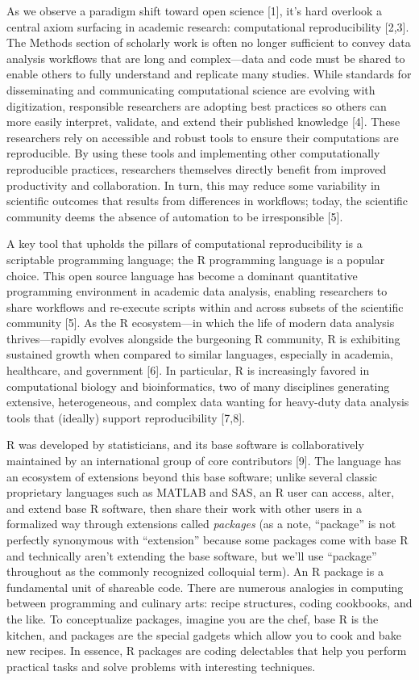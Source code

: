 \documentclass[10pt,letterpaper]{article}
\begin{document}
As we observe a paradigm shift toward open science {[}1{]}, it's hard
overlook a central axiom surfacing in academic research: computational
reproducibility {[}2,3{]}. The Methods section of scholarly work is
often no longer sufficient to convey data analysis workflows that are
long and complex---data and code must be shared to enable others to
fully understand and replicate many studies. While standards for
disseminating and communicating computational science are evolving with
digitization, responsible researchers are adopting best practices so
others can more easily interpret, validate, and extend their published
knowledge {[}4{]}. These researchers rely on accessible and robust tools
to ensure their computations are reproducible. By using these tools and
implementing other computationally reproducible practices, researchers
themselves directly benefit from improved productivity and
collaboration. In turn, this may reduce some variability in scientific
outcomes that results from differences in workflows; today, the
scientific community deems the absence of automation to be irresponsible
{[}5{]}.

A key tool that upholds the pillars of computational reproducibility is
a scriptable programming language; the R programming language is a
popular choice. This open source language has become a dominant
quantitative programming environment in academic data analysis, enabling
researchers to share workflows and re-execute scripts within and across
subsets of the scientific community {[}5{]}. As the R ecosystem---in
which the life of modern data analysis thrives---rapidly evolves
alongside the burgeoning R community, R is exhibiting sustained growth
when compared to similar languages, especially in academia, healthcare,
and government {[}6{]}. In particular, R is increasingly favored in
computational biology and bioinformatics, two of many disciplines
generating extensive, heterogeneous, and complex data wanting for
heavy-duty data analysis tools that (ideally) support reproducibility
{[}7,8{]}.

R was developed by statisticians, and its base software is
collaboratively maintained by an international group of core
contributors {[}9{]}. The language has an ecosystem of extensions beyond
this base software; unlike several classic proprietary languages such as
MATLAB and SAS, an R user can access, alter, and extend base R software,
then share their work with other users in a formalized way through
extensions called \emph{packages} (as a note, ``package'' is not
perfectly synonymous with ``extension'' because some packages come with
base R and technically aren't extending the base software, but we'll use
``package'' throughout as the commonly recognized colloquial term). An R
package is a fundamental unit of shareable code. There are numerous
analogies in computing between programming and culinary arts: recipe
structures, coding cookbooks, and the like. To conceptualize packages,
imagine you are the chef, base R is the kitchen, and packages are the
special gadgets which allow you to cook and bake new recipes. In
essence, R packages are coding delectables that help you perform
practical tasks and solve problems with interesting techniques.
\end{document}
